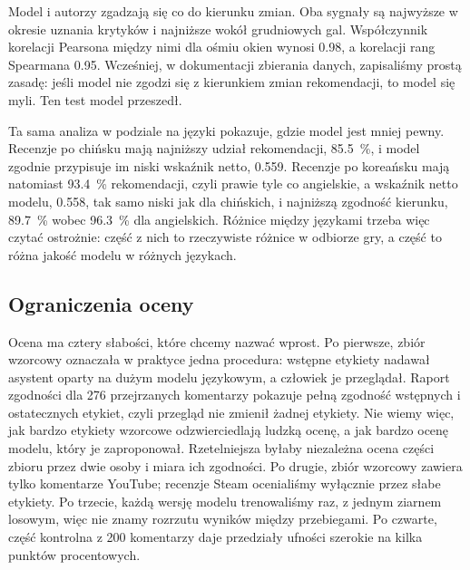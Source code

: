 Model i autorzy zgadzają się co do kierunku zmian.
Oba sygnały są najwyższe w okresie uznania krytyków i najniższe wokół grudniowych gal.
Współczynnik korelacji Pearsona między nimi dla ośmiu okien wynosi \num{0.98}, a korelacji rang Spearmana \num{0.95}.
Wcześniej, w dokumentacji zbierania danych, zapisaliśmy prostą zasadę: jeśli model nie zgodzi się z kierunkiem zmian rekomendacji, to model się myli.
Ten test model przeszedł.

Ta sama analiza w podziale na języki pokazuje, gdzie model jest mniej pewny.
Recenzje po chińsku mają najniższy udział rekomendacji, \qty{85.5}{\percent}, i model zgodnie przypisuje im niski wskaźnik netto, \num{0.559}.
Recenzje po koreańsku mają natomiast \qty{93.4}{\percent} rekomendacji, czyli prawie tyle co angielskie, a wskaźnik netto modelu, \num{0.558}, tak samo niski jak dla chińskich, i najniższą zgodność kierunku, \qty{89.7}{\percent} wobec \qty{96.3}{\percent} dla angielskich.
Różnice między językami trzeba więc czytać ostrożnie: część z nich to rzeczywiste różnice w odbiorze gry, a część to różna jakość modelu w różnych językach.

\subsection{Ograniczenia oceny}
\label{sec:eval-quality-limits}

Ocena ma cztery słabości, które chcemy nazwać wprost.
Po pierwsze, zbiór wzorcowy oznaczała w praktyce jedna procedura: wstępne etykiety nadawał asystent oparty na dużym modelu językowym, a człowiek je przeglądał.
Raport zgodności dla 276 przejrzanych komentarzy pokazuje pełną zgodność wstępnych i ostatecznych etykiet, czyli przegląd nie zmienił żadnej etykiety.
Nie wiemy więc, jak bardzo etykiety wzorcowe odzwierciedlają ludzką ocenę, a jak bardzo ocenę modelu, który je zaproponował.
Rzetelniejsza byłaby niezależna ocena części zbioru przez dwie osoby i miara ich zgodności.
Po drugie, zbiór wzorcowy zawiera tylko komentarze YouTube; recenzje Steam ocenialiśmy wyłącznie przez słabe etykiety.
Po trzecie, każdą wersję modelu trenowaliśmy raz, z jednym ziarnem losowym, więc nie znamy rozrzutu wyników między przebiegami.
Po czwarte, część kontrolna z 200 komentarzy daje przedziały ufności szerokie na kilka punktów procentowych.

